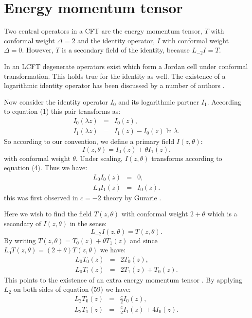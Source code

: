 \documentclass[a4paper,11pt]{article}
\begin{document}
\section{Energy momentum tensor}
Two central operators in a CFT are the energy momentum tensor,
$T$ with conformal weight $\Delta=2$ and the identity operator,
$I$ with conformal weight $\Delta=0$. However, $T$ is a secondary
field of the identity, because $L_{-2}I=T$.

 In an LCFT degenerate
operators exist which form a Jordan cell under conformal
transformation. This holds true for the identity as well. The
existence of a logarithmic identity operator has been discussed
by a number of authors \cite{Gur,I1,I2}.

 Now consider the
identity operator $I_{0}$ and its logarithmic partner $I_{1}$.
According to equation (1) this pair transforms as:
\begin{eqnarray}
I_{0}(\lambda z)&=&I_{0}(z) ,\nonumber\\ I_{1}(\lambda
z)&=&I_{1}(z)-I_{0}(z)\ln \lambda .
\end{eqnarray}
So according to our convention, we define a primary field
$I(z,\theta)$:
\begin{equation}
I(z,\theta)=I_{0}(z)+\theta I_{1}(z) .
\end{equation}
with conformal weight $\theta$. Under scaling, $I(z,\theta)$
transforms according to equation (4). Thus we have:
\begin{eqnarray}
L_{0}I_{0}(z)&=&0 ,\nonumber\\ L_{0}I_{1}(z)&=&I_{0}(z).
\end{eqnarray}
this was first observed in $c=-2$ theory by Gurarie \cite{Gur}.

Here we wish to find the field $T(z,\theta)$ with conformal weight
$2+\theta$ which is a secondary of $I(z,\theta)$ in the sense:
\begin{equation}
L_{-2}I(z,\theta)=T(z,\theta) .
\end{equation}
By writing $T(z,\theta)=T_{0}(z)+\theta T_{1}(z)$ and since
$L_{0}T(z,\theta)=(2+\theta)T(z,\theta)$ we have:
\begin{eqnarray}
L_{0}T_{0}(z)&=&2T_{0}(z) ,\nonumber\\
L_{0}T_{1}(z)&=&2T_{1}(z)+T_{0}(z) .
\end{eqnarray}
This points to the existence of an extra energy momentum tensor
\cite{GL,I1,I2}. By applying $L_{2}$ on both sides of equation
(59) we have:
\begin{eqnarray}
L_{2}T_{0}(z)&=&\frac{c}{2}I_{0}(z) ,\nonumber\\
L_{2}T_{1}(z)&=&\frac{c}{2}I_{1}(z)+4I_{0}(z) .
\end{eqnarray}
\end{document}
